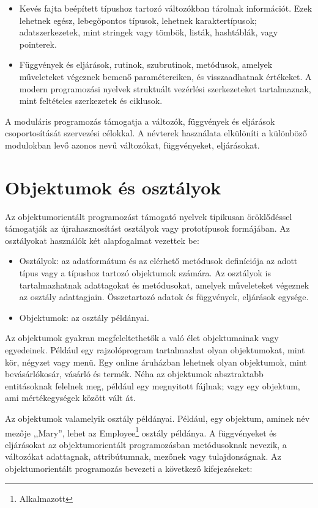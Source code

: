 \documentclass[a4paper,12pt,twoside]{report}
\theoremstyle{definition}
\begin{document}
	\begin{itemize}
	\item Kevés fajta beépített típushoz tartozó változókban tárolnak információt. Ezek lehetnek egész, lebegőpontos típusok, lehetnek karaktertípusok; adatszerkezetek, mint stringek vagy tömbök, listák, hashtáblák, vagy pointerek.
	\item Függvények és eljárások, rutinok, szubrutinok, metódusok, amelyek műveleteket végeznek bemenő paramétereiken, és visszaadhatnak értékeket. A modern programozási nyelvek struktuált vezérlési szerkezeteket tartalmaznak, mint feltételes szerkezetek és ciklusok.
	\end{itemize}

	A moduláris programozás támogatja a változók, függvények és eljárások csoportosítását szervezési célokkal. A névterek használata elkülöníti a különböző modulokban levő azonos nevű változókat, függvényeket, eljárásokat.
	
	\section{Objektumok és osztályok}
	Az objektumorientált programozást támogató nyelvek tipikusan öröklődéssel támogatják az újrahasznosítást osztályok vagy prototípusok formájában. Az osztályokat használók két alapfogalmat vezettek be:
	
	\begin{itemize}
	\item Osztályok: az adatformátum és az elérhető metódusok definíciója az adott típus vagy a típushoz tartozó objektumok számára. Az osztályok is tartalmazhatnak adattagokat és metódusokat, amelyek műveleteket végeznek az osztály adattagjain. Összetartozó adatok és függvények, eljárások egysége.
	\item Objektumok: az osztály példányai.
	\end{itemize}

	Az objektumok gyakran megfeleltethetők a való élet objektumainak vagy egyedeinek. Például egy rajzolóprogram tartalmazhat olyan objektumokat, mint kör, négyzet vagy menü. Egy online áruházban lehetnek olyan objektumok, mint bevásárlókosár, vásárló és termék. Néha az objektumok absztraktabb entitásoknak felelnek meg, például egy megnyitott fájlnak; vagy egy objektum, ami mértékegységek között vált át.
	
	Az objektumok valamelyik osztály példányai. Például, egy objektum, aminek név mezője ,,Mary'', lehet az Employee\footnote{Alkalmazott} osztály példánya. A függvényeket és eljárásokat az objektumorientált programozásban metódusoknak nevezik, a változókat adattagnak, attribútumnak, mezőnek vagy tulajdonságnak. Az objektumorientált programozás bevezeti a következő kifejezéseket:
	
\end{document}
